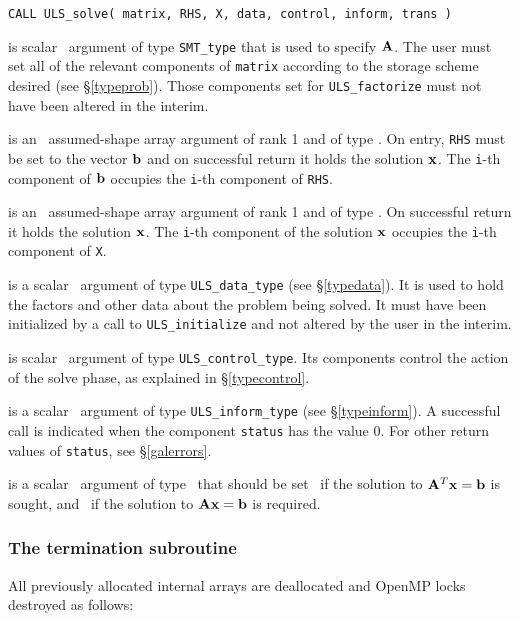 \documentclass{galahad}
\newcommand{\packagename}{ULS}
\begin{document}
\hskip0.5in
{\tt CALL \packagename\_solve( matrix, RHS, X, data, control, inform, trans )}

\begin{description}

 is scalar \intentin\ argument of type {\tt SMT\_type}
that is used to specify ${\mathbf{A}}$.
The user must set all of the relevant components of {\tt matrix} according
to the storage scheme desired (see \S\ref{typeprob}). Those components
set for {\tt \packagename\_factorize} must not have been altered in the interim.

 is an \intentin\ assumed-shape array argument of rank 1
and of type \realdp.  On entry, {\tt RHS} must be set
to the vector ${\mathbf{b}}$ and on successful return it holds
the solution ${\mathbf{x}}$. The {\tt i}-th component of ${\mathbf{b}}$
occupies the {\tt i}-th component of {\tt RHS}. 

 is an \intentinout\ assumed-shape array argument of rank 1
and of type \realdp.  On successful return it holds the solution ${\mathbf{x}}$. 
The {\tt i}-th component of the solution ${\mathbf{x}}$
occupies the {\tt i}-th component of {\tt X}.

 is a scalar \intentinout\ argument of type
{\tt \packagename\_data\_type}
(see \S\ref{typedata}). It is used to hold the factors and other
data about the problem being solved.
It must have been initialized by a call to
{\tt \packagename\_ini\-tialize} and not altered by the user in the interim.

 is scalar \intentin\ argument of type
{\tt \packagename\_control\_type}. Its components control the action
of the solve phase, as explained in
\S\ref{typecontrol}.

 is a scalar \intentinout\ argument of type
{\tt \packagename\_inform\_type}
(see \S\ref{typeinform}).
A successful call is indicated when the  component {\tt status} has the value 0.
For other return values of {\tt status}, see \S\ref{galerrors}.

 is a scalar \intentin\ argument of type \logical\ that should be
set \true\ if the solution to ${\mathbf{A}}^T {\mathbf{x}} = {\mathbf{b}}$ is sought, 
and \false\ if the solution to ${\mathbf{A}} {\mathbf{x}} = {\mathbf{b}}$ is required.

\end{description}


\subsubsection{The termination subroutine}
All previously allocated internal arrays are deallocated and OpenMP locks
destroyed as follows:
\end{document}
